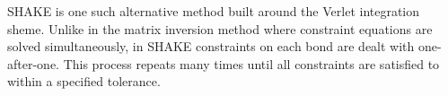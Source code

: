 \par SHAKE is one such alternative method built around the Verlet integration sheme. Unlike in the matrix inversion method where constraint equations are solved simultaneously, in SHAKE constraints on each bond are dealt with one-after-one. This process repeats many times until all constraints are satisfied to within a specified tolerance.
